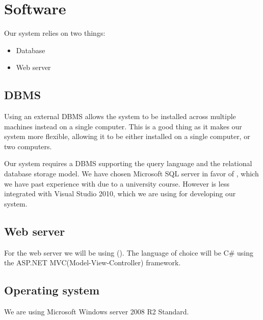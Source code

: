 \section{Software}
\label{sec:software}

Our system relies on two things:

\begin{itemize}
	\item Database
	\item Web server
\end{itemize}

\subsection{DBMS}
\label{subsec:dbms}

Using an external DBMS allows the system to be installed across multiple machines instead on a single computer. This is a good thing as it makes our system more flexible, allowing it to be either installed on a single computer, or two computers.

Our system requires a DBMS supporting the query language \sql[] and the relational database storage model.
We have chosen Microsoft SQL server in favor of \posgresql[], which we have past experience with due to a university course. However \posgresql[] is less integrated with Visual Studio 2010, which we are using for developing our system.

\subsection{Web server}
\label{subsec:webserver}

For the web server we will be using  \wholeiis[] (\iis[]). 
The language of choice will be C\# using the ASP.NET MVC(Model-View-Controller) framework. \\


\subsection{Operating system}
\label{subsec:operating_system}

We are using Microsoft Windows server 2008 R2 Standard. 